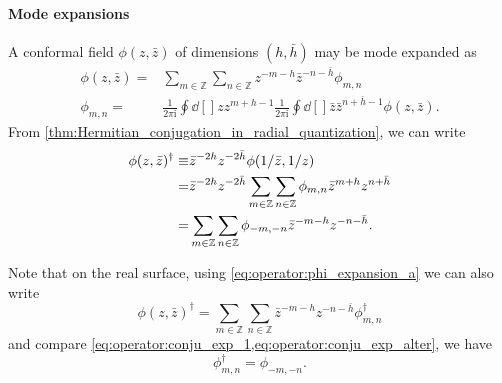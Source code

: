 \documentclass[10pt]{article}
\newcommand{\ii}{\mathrm{i}}
\begin{document}
\paragraph{Mode expansions}
A conformal field $\phi(z,\bar{z})$ of dimensions $(h,\bar{h})$ may be mode expanded as
\begin{subequations}\label{eq:operator:phi_expansion}
    \begin{align}
        \phi(z,\bar{z})= & \sum_{m\in\mathbb{Z}}\sum_{n\in\mathbb{Z}}z^{-m-h}\bar{z}^{-n-\bar{h}}\phi_{m,n}\label{eq:operator:phi_expansion_a} \\
        \phi_{m,n}=      & \frac{1}{2\pi\ii}\oint\dd[]{z}z^{m+h-1}\frac{1}{2\pi\ii}\oint\dd[]{\bar{z}}\bar{z}^{n+\bar{h}-1}\phi(z,\bar{z}).
    \end{align}
\end{subequations}
From \cref{thm:Hermitian_conjugation_in_radial_quantization}, we can write
\begin{align}
    \phi(z,\bar{z})^\dagger\equiv & \bar{z}^{-2h} z^{-2\bar{h}}\phi(1/\bar{z},1/z)\notag                                                               \\
    =                             & \bar{z}^{-2h}z^{-2\bar{h}}\sum_{m\in\mathbb{Z}}\sum_{n\in\mathbb{Z}}\phi_{m,n}\bar{z}^{m+h}z^{n+\bar{h}}\notag     \\
    =                             & \sum_{m\in\mathbb{Z}}\sum_{n\in\mathbb{Z}}\phi_{-m,-n}\bar{z}^{-m-h}z^{-n-\bar{h}}.\label{eq:operator:conju_exp_1}
\end{align}

Note that on the real surface, using \cref{eq:operator:phi_expansion_a} we can also write
\begin{equation}
    \phi(z,\bar{z})^\dagger=\sum_{m\in\mathbb{Z}}\sum_{n\in\mathbb{Z}}\bar{z}^{-m-h}z^{-n-\bar{h}}\phi^\dagger_{m,n}\label{eq:operator:conju_exp_alter}
\end{equation}
and compare \cref{eq:operator:conju_exp_1,eq:operator:conju_exp_alter}, we have
\begin{equation}
    \phi^\dagger_{m,n}=\phi_{-m,-n}.
\end{equation}
\end{document}
